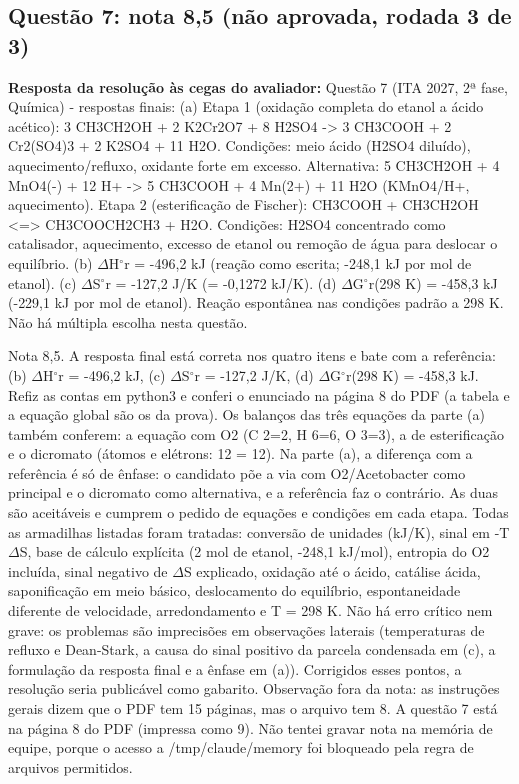 \documentclass{article}%
\begin{document}
\subsection*{Questão 7: nota 8,5 (não aprovada, rodada 3 de 3)}%
\textbf{Resposta da resolução às cegas do avaliador:} Questão 7 (ITA 2027, 2ª fase, Química) {-} respostas finais:\newline%
\newline%
(a) Etapa 1 (oxidação completa do etanol a ácido acético): 3 CH3CH2OH + 2 K2Cr2O7 + 8 H2SO4 {-}> 3 CH3COOH + 2 Cr2(SO4)3 + 2 K2SO4 + 11 H2O. Condições: meio ácido (H2SO4 diluído), aquecimento/refluxo, oxidante forte em excesso. Alternativa: 5 CH3CH2OH + 4 MnO4({-}) + 12 H+ {-}> 5 CH3COOH + 4 Mn(2+) + 11 H2O (KMnO4/H+, aquecimento).\newline%
Etapa 2 (esterificação de Fischer): CH3COOH + CH3CH2OH <=> CH3COOCH2CH3 + H2O. Condições: H2SO4 concentrado como catalisador, aquecimento, excesso de etanol ou remoção de água para deslocar o equilíbrio.\newline%
\newline%
(b) $\Delta$H$^\circ$r = {-}496,2 kJ (reação como escrita; {-}248,1 kJ por mol de etanol).\newline%
(c) $\Delta$S$^\circ$r = {-}127,2 J/K (= {-}0,1272 kJ/K).\newline%
(d) $\Delta$G$^\circ$r(298 K) = {-}458,3 kJ ({-}229,1 kJ por mol de etanol). Reação espontânea nas condições padrão a 298 K.\newline%
\newline%
Não há múltipla escolha nesta questão.\par %
Nota 8,5. A resposta final está correta nos quatro itens e bate com a referência: (b) $\Delta$H$^\circ$r = -496,2 kJ, (c) $\Delta$S$^\circ$r = -127,2 J/K, (d) $\Delta$G$^\circ$r(298 K) = -458,3 kJ. Refiz as contas em python3 e conferi o enunciado na página 8 do PDF (a tabela e a equação global são os da prova). Os balanços das três equações da parte (a) também conferem: a equação com O2 (C 2=2, H 6=6, O 3=3), a de esterificação e o dicromato (átomos e elétrons: 12 = 12). Na parte (a), a diferença com a referência é só de ênfase: o candidato põe a via com O2/Acetobacter como principal e o dicromato como alternativa, e a referência faz o contrário. As duas são aceitáveis e cumprem o pedido de equações e condições em cada etapa. Todas as armadilhas listadas foram tratadas: conversão de unidades (kJ/K), sinal em -T$\Delta$S, base de cálculo explícita (2 mol de etanol, -248,1 kJ/mol), entropia do O2 incluída, sinal negativo de $\Delta$S explicado, oxidação até o ácido, catálise ácida, saponificação em meio básico, deslocamento do equilíbrio, espontaneidade diferente de velocidade, arredondamento e T = 298 K. Não há erro crítico nem grave: os problemas são imprecisões em observações laterais (temperaturas de refluxo e Dean{-}Stark, a causa do sinal positivo da parcela condensada em (c), a formulação da resposta final e a ênfase em (a)). Corrigidos esses pontos, a resolução seria publicável como gabarito. Observação fora da nota: as instruções gerais dizem que o PDF tem 15 páginas, mas o arquivo tem 8. A questão 7 está na página 8 do PDF (impressa como 9). Não tentei gravar nota na memória de equipe, porque o acesso a /tmp/claude/memory foi bloqueado pela regra de arquivos permitidos.%
\end{document}
